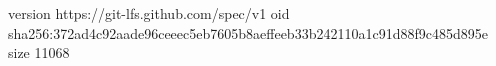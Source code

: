 version https://git-lfs.github.com/spec/v1
oid sha256:372ad4c92aade96ceeec5eb7605b8aeffeeb33b242110a1c91d88f9c485d895e
size 11068
